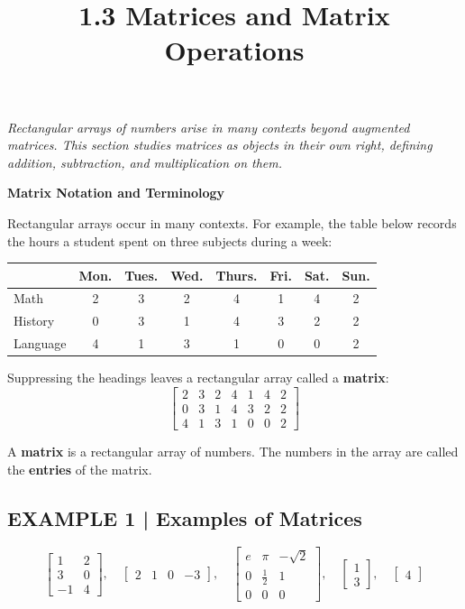 \documentclass{article}
\title{1.3 Matrices and Matrix Operations}
\date{}
\author{}
\newcommand{\redheading}[1]{{\vspace{2mm}\noindent\Large\bfseries\color{red!55!black} #1\par}\vspace{2mm}}
\theoremstyle{mystyle}
\begin{document}
\maketitle

{\itshape\color{blue!45!black}
Rectangular arrays of numbers arise in many contexts beyond augmented matrices. This section studies matrices as objects in their own right, defining addition, subtraction, and multiplication on them.\par}

\redheading{Matrix Notation and Terminology}

Rectangular arrays occur in many contexts. For example, the table below records the hours a student spent on three subjects during a week:

\begin{center}
\begin{tabular}{|l|c|c|c|c|c|c|c|}
\hline
 & Mon. & Tues. & Wed. & Thurs. & Fri. & Sat. & Sun.\\
\hline
Math & 2 & 3 & 2 & 4 & 1 & 4 & 2\\
\hline
History & 0 & 3 & 1 & 4 & 3 & 2 & 2\\
\hline
Language & 4 & 1 & 3 & 1 & 0 & 0 & 2\\
\hline
\end{tabular}
\end{center}

Suppressing the headings leaves a rectangular array called a \textbf{matrix}:
\[
\begin{bmatrix}2&3&2&4&1&4&2\\0&3&1&4&3&2&2\\4&1&3&1&0&0&2\end{bmatrix}
\]

\begin{tcolorbox}[colback=teal!4, colframe=teal!65!black, title=Definition 1, fonttitle=\bfseries, boxrule=0.5mm, arc=3mm]
A \textbf{matrix} is a rectangular array of numbers. The numbers in the array are called the \textbf{entries} of the matrix.
\end{tcolorbox}

\subsection*{EXAMPLE 1 | Examples of Matrices}
\[
\begin{bmatrix}1&2\\3&0\\-1&4\end{bmatrix},\quad
\begin{bmatrix}2&1&0&-3\end{bmatrix},\quad
\begin{bmatrix}e&\pi&-\sqrt2\\0&\tfrac12&1\\0&0&0\end{bmatrix},\quad
\begin{bmatrix}1\\3\end{bmatrix},\quad
\begin{bmatrix}4\end{bmatrix}
\]
\end{document}
